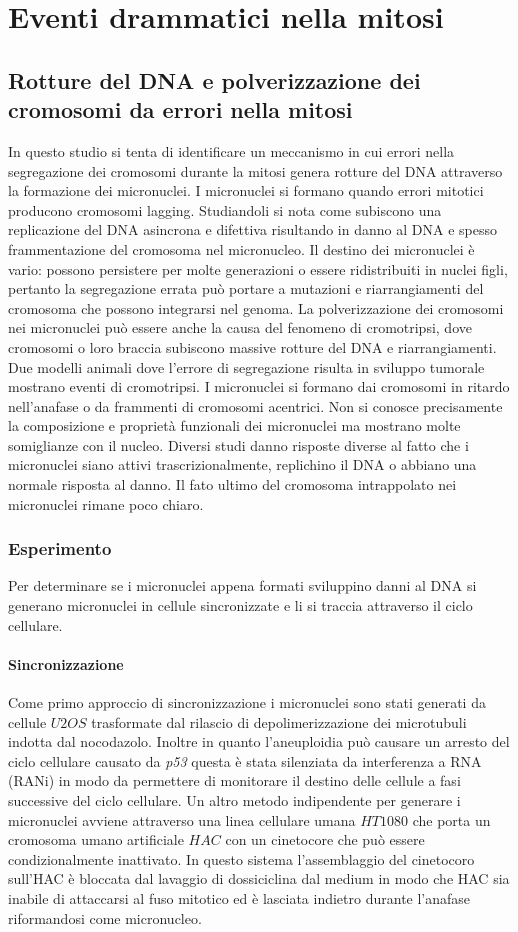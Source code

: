 \section{Eventi drammatici nella mitosi}
\subsection{Rotture del DNA e polverizzazione dei cromosomi da errori nella mitosi}
In questo studio si tenta di identificare un meccanismo in cui errori nella segregazione dei cromosomi durante la mitosi genera rotture del DNA attraverso la formazione dei micronuclei. 
I micronuclei si formano quando errori mitotici producono cromosomi lagging. Studiandoli si nota come subiscono una replicazione del DNA asincrona e difettiva risultando in danno al
DNA e spesso frammentazione del cromosoma nel micronucleo. Il destino dei micronuclei \`e vario: possono persistere per molte generazioni o essere ridistribuiti in nuclei figli, pertanto
la segregazione errata pu\`o portare a mutazioni e riarrangiamenti del cromosoma che possono integrarsi nel genoma. La polverizzazione dei cromosomi nei micronuclei pu\`o essere anche
la causa del fenomeno di cromotripsi, dove cromosomi o loro braccia subiscono massive rotture del DNA e riarrangiamenti. Due modelli animali dove l'errore di segregazione risulta in 
sviluppo tumorale mostrano eventi di cromotripsi. I micronuclei si formano dai cromosomi in ritardo nell'anafase o da frammenti di cromosomi acentrici. Non si conosce precisamente la
composizione e propriet\`a funzionali dei micronuclei ma mostrano molte somiglianze con il nucleo. Diversi studi danno risposte diverse al fatto che i micronuclei siano attivi 
trascrizionalmente, replichino il DNA o abbiano una normale risposta al danno. Il fato ultimo del cromosoma intrappolato nei micronuclei rimane poco chiaro. 
\subsubsection{Esperimento}
Per determinare se i micronuclei appena formati sviluppino danni al DNA si generano micronuclei in cellule sincronizzate e li si traccia attraverso il ciclo cellulare. 
\paragraph{Sincronizzazione} 
Come primo approccio di sincronizzazione i micronuclei sono stati generati da cellule $U2OS$ trasformate dal rilascio di depolimerizzazione dei microtubuli indotta dal nocodazolo. 
Inoltre in quanto l'aneuploidia pu\`o causare un arresto del ciclo cellulare causato da \emph{p53} questa \`e stata silenziata da interferenza a RNA (RANi) in modo da permettere di 
monitorare il destino delle cellule a fasi successive del ciclo cellulare. Un altro metodo indipendente per generare i micronuclei avviene attraverso una linea cellulare umana $HT1080$ 
che porta un cromosoma umano artificiale $HAC$ con un cinetocore che pu\`o essere condizionalmente inattivato. In questo sistema l'assemblaggio del cinetocoro sull'HAC \`e bloccata dal
lavaggio di dossiciclina dal medium in modo che HAC sia inabile di attaccarsi al fuso mitotico ed \`e lasciata indietro durante l'anafase riformandosi come micronucleo. 
